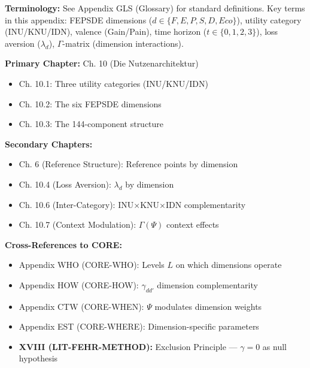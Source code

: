 
\begin{tcolorbox}[colback=gray!5!white, colframe=gray!50!black]
\textbf{Terminology:} See Appendix GLS (Glossary) for standard definitions.
Key terms in this appendix: FEPSDE dimensions ($d \in \{F,E,P,S,D,Eco\}$),
utility category (INU/KNU/IDN), valence (Gain/Pain), time horizon ($t \in \{0,1,2,3\}$),
loss aversion ($\lambda_d$), $\Gamma$-matrix (dimension interactions).
\end{tcolorbox}

\begin{tcolorbox}[colback=green!5!white, colframe=green!75!black,
    title=\textbf{Chapter References}]

\textbf{Primary Chapter:} Ch. 10 (Die Nutzenarchitektur)
\begin{itemize}[nosep]
    \item Ch. 10.1: Three utility categories (INU/KNU/IDN)
    \item Ch. 10.2: The six FEPSDE dimensions
    \item Ch. 10.3: The 144-component structure
\end{itemize}

\textbf{Secondary Chapters:}
\begin{itemize}[nosep]
    \item Ch. 6 (Reference Structure): Reference points by dimension
    \item Ch. 10.4 (Loss Aversion): $\lambda_d$ by dimension
    \item Ch. 10.6 (Inter-Category): INU$\times$KNU$\times$IDN complementarity
    \item Ch. 10.7 (Context Modulation): $\Gamma(\Psi)$ context effects
\end{itemize}

\textbf{Cross-References to CORE:}
\begin{itemize}[nosep]
    \item Appendix WHO (CORE-WHO): Levels $L$ on which dimensions operate
    \item Appendix HOW (CORE-HOW): $\gamma_{dd'}$ dimension complementarity
    \item Appendix CTW (CORE-WHEN): $\Psi$ modulates dimension weights
    \item Appendix EST (CORE-WHERE): Dimension-specific parameters
    \item \textbf{XVIII (LIT-FEHR-METHOD):} Exclusion Principle --- $\gamma = 0$ as null hypothesis
\end{itemize}

\end{tcolorbox}

